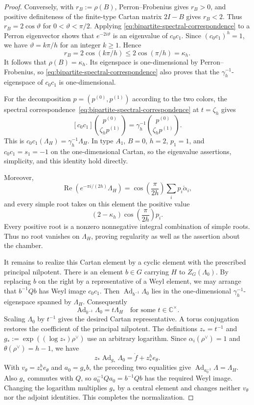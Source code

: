 \documentclass[11pt,leqno]{amsart}
\numberwithin{equation}{section}
\theoremstyle{plain}
\theoremstyle{definition}
\theoremstyle{plain}
\theoremstyle{definition}
\theoremstyle{remark}
\begin{document}
\begin{proof}
Conversely, with $r_B:=\rho(B)$, Perron--Frobenius gives $r_B>0$, and positive definiteness of the finite-type Cartan matrix $2I-B$ gives $r_B<2$.  Thus $r_B=2\cos\vartheta$ for $0<\vartheta<\pi/2$.  Applying \eqref{eq:bipartite-spectral-correspondence} to a Perron eigenvector shows that $e^{-2i\vartheta}$ is an eigenvalue of $c_0c_1$.  Since $(c_0c_1)^h=1$, we have $\vartheta=k\pi/h$ for an integer $k\ge1$.  Hence
\[
 r_B=2\cos(k\pi/h)\le2\cos(\pi/h)=\kappa_h.
\]
It follows that $\rho(B)=\kappa_h$.  Its eigenspace is one-dimensional by Perron--Frobenius, so \eqref{eq:bipartite-spectral-correspondence} also proves that the $\gamma_h^{-1}$-eigenspace of $c_0c_1$ is one-dimensional.

For the decomposition $p=(p^{(0)},p^{(1)})$ according to the two colors, the spectral correspondence~\eqref{eq:bipartite-spectral-correspondence} at $t=\zeta_h$ gives
\[
 [c_0c_1]\binom{p^{(0)}}{\zeta_hp^{(1)}}
 =\gamma_h^{-1}\binom{p^{(0)}}{\zeta_hp^{(1)}}.
\]
This is $c_0c_1(\Lambda_H)=\gamma_h^{-1}\Lambda_H$.  In type $A_1$, $B=0$, $h=2$, $p_1=1$, and $c_0c_1=s_1=-1$ on the one-dimensional Cartan, so the eigenvalue assertions, simplicity, and this identity hold directly.

Moreover,
\[
 \operatorname{Re}(e^{-\pi i/(2h)}\Lambda_H)
 =\cos\!\left(\frac{\pi}{2h}\right)\sum_i p_i\check\alpha_i,
\]
and every simple root takes on this element the positive value
\[
 (2-\kappa_h)\cos\!\left(\frac{\pi}{2h}\right)p_i.
\]
Every positive root is a nonzero nonnegative integral combination of simple roots.  Thus no root vanishes on $\Lambda_H$, proving regularity as well as the assertion about the chamber.

It remains to realize this Cartan element by a cyclic element with the prescribed principal nilpotent.  There is an element $b\in G$ carrying $H$ to $Z_G(\Lambda_0)$.  By replacing $b$ on the right by a representative of a Weyl element, we may arrange that $b^{-1}Qb$ has Weyl image $c_0c_1$.  Then $\operatorname{Ad}_{b^{-1}}\Lambda_0$ lies in the one-dimensional $\gamma_h^{-1}$-eigenspace spanned by $\Lambda_H$.  Consequently
\[
 \operatorname{Ad}_{b^{-1}}\Lambda_0=t\Lambda_H
 \quad\text{for some }t\in\mathbb C^\times.
\]
Scaling $\Lambda_0$ by $t^{-1}$ gives the desired Cartan representative.  A torus conjugation restores the coefficient of the principal nilpotent.  The definitions $z_*=t^{-1}$ and $g_*:=\exp((\log z_*)\rho^\vee)$ use an arbitrary logarithm.  Since $\alpha_i(\rho^\vee)=1$ and $\theta(\rho^\vee)=h-1$, we have
\[
 z_*\operatorname{Ad}_{g_*}\Lambda_0
 =\mathring f+z_*^h e_\theta.
\]
With $v_\theta=z_*^h e_\theta$ and $a_0=g_*b$, the preceding two equalities give $\operatorname{Ad}_{a_0^{-1}}\Lambda=\Lambda_H$.  Also $g_*$ commutes with $Q$, so $a_0^{-1}Qa_0=b^{-1}Qb$ has the required Weyl image.  Changing the logarithm multiplies $g_*$ by a central element and changes neither $v_\theta$ nor the adjoint identities.  This completes the normalization.
\end{proof}
\end{document}
